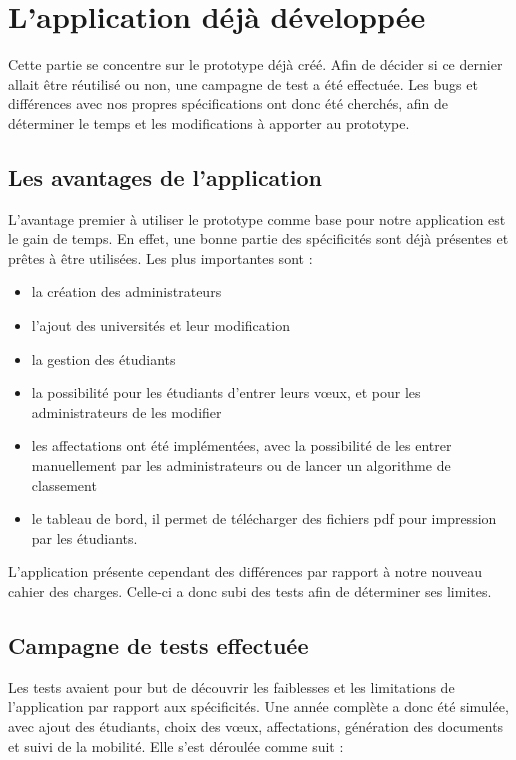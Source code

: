 \section{L'application déjà développée}

Cette partie se concentre sur le prototype déjà créé. Afin de décider si ce dernier allait être réutilisé ou non, une campagne de test a été effectuée. Les bugs et différences avec nos propres spécifications ont donc été cherchés, afin de déterminer le temps et les modifications à apporter au prototype.


\subsection{Les avantages de l'application}

L'avantage premier à utiliser le prototype comme base pour notre application est le gain de temps. En effet, une bonne partie des spécificités sont déjà présentes et prêtes à être utilisées.
Les plus importantes sont :
\begin{itemize}
\item la création des administrateurs
\item l'ajout des universités et leur modification
\item la gestion des étudiants
\item la possibilité pour les étudiants d'entrer leurs vœux, et pour les administrateurs de les modifier
\item les affectations ont été implémentées, avec la possibilité de les entrer manuellement par les administrateurs ou de lancer un algorithme de classement
\item le tableau de bord, il permet de télécharger des fichiers pdf pour impression par les étudiants.
\end{itemize}

L'application présente cependant des différences par rapport à notre nouveau cahier des charges. Celle-ci a donc subi des tests afin de déterminer ses limites.


\subsection{Campagne de tests effectuée}

Les tests avaient pour but de découvrir les faiblesses et les limitations de l'application par rapport aux spécificités. Une année complète a donc été simulée, avec ajout des étudiants, choix des vœux, affectations, génération des documents et suivi de la mobilité.
Elle s'est déroulée comme suit :

